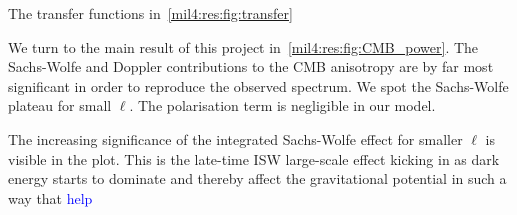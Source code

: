 


The transfer functions in~\cref{mil4:res:fig:transfer} 



We turn to the main result of this project in~\cref{mil4:res:fig:CMB_power}. The Sachs-Wolfe and Doppler contributions to the CMB anisotropy are by far most significant in order to reproduce the observed spectrum. We spot the Sachs-Wolfe plateau for small $\ell$. The polarisation term is negligible in our model. 

The increasing significance of the integrated Sachs-Wolfe effect for smaller $\ell$ is visible in the plot. This is the late-time ISW large-scale effect kicking in as dark energy starts to dominate and thereby affect the gravitational potential in such a way that \textcolor{blue}{help}
